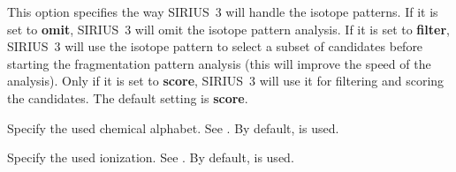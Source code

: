 \documentclass[letterpaper,10pt,openany,oneside]{sphinxmanual}
\begin{document}

\begin{fulllineitems}
\label{commandline:cmdoption-s}
This option specifies the way SIRIUS~3 will handle the isotope patterns. If it is set to \textbf{omit}, SIRIUS~3 will omit the isotope pattern analysis. If it is set to \textbf{filter}, SIRIUS~3 will use the isotope pattern to select a subset of candidates before starting the fragmentation pattern analysis (this will improve the speed of the analysis). Only if it is set to \textbf{score}, SIRIUS~3 will use it for filtering and scoring the candidates. The default setting is \textbf{score}.

\end{fulllineitems}


\begin{fulllineitems}
\label{commandline:cmdoption-e}
Specify the used chemical alphabet. See {\hyperref[commandline:alphabets]{}}. By default,  is used.

\end{fulllineitems}


\begin{fulllineitems}
\label{commandline:cmdoption-i}
Specify the used ionization. See {\hyperref[commandline:ions]{}}. By default, \code{{[}M+H{]}+} is used.

\end{fulllineitems}
\end{document}

